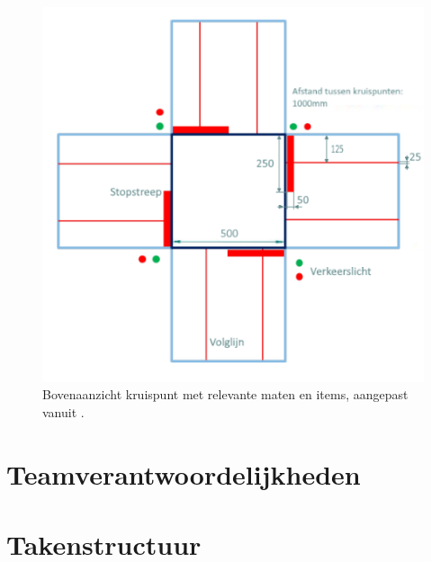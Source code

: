 \documentclass[a4paper,twoside,kulak]{kulakreport}
\begin{document}
	\begin{figure}
		\centering
		\includegraphics[width=.8\textwidth]{bovenaanzichtkruispunt}
		\caption{Bovenaanzicht kruispunt met relevante maten en items, aangepast vanuit \cite{Smart}.
		}
		\label{fig: kruispunt}
		
	\end{figure}

	

	\bigskip
	
	\section{Teamverantwoordelijkheden}
	\label{seq: vera}
	
	
	\section{Takenstructuur}
	\label{sec: taken}
	
\end{document}
